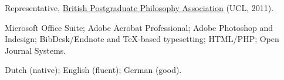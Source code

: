 \documentclass[11pt]{article}
\begin{document}
\ind Representative, \href{http://www.bppa-online.org}{British Postgraduate Philosophy Association} (UCL, 2011).

\bigskip

\medskip

\ind Microsoft Office Suite; Adobe Acrobat Professional; Adobe Photoshop and Indesign; BibDesk/Endnote and TeX-based typesetting; HTML/PHP; Open Journal Systems.

\bigskip 

\medskip

\ind Dutch (native); English (fluent); German (good).

\rfoot{\footnotesize{\today}}
\end{document}

